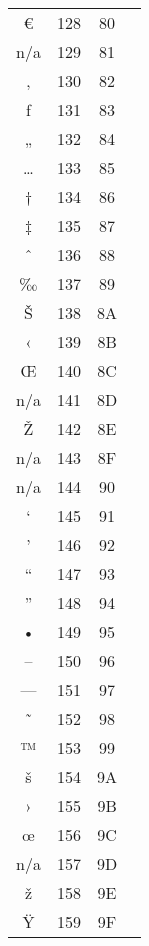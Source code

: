 \documentclass[10pt]{article}
\begin{document}
\begin{tabular}{crcl}
€&128&80&\\
n/a&129&81&\\
‚&130&82&\\
ƒ&131&83&\\
„&132&84&\\
…&133&85&\\
†&134&86&\\
‡&135&87&\\
ˆ&136&88&\\
‰&137&89&\\
Š&138&8A&\\
‹&139&8B&\\
Œ&140&8C&\\
n/a&141&8D&\\
Ž&142&8E&\\
n/a&143&8F&\\
n/a&144&90&\\
‘&145&91&\\
’&146&92&\\
“&147&93&\\
”&148&94&\\
•&149&95&\\
–&150&96&\\
—&151&97&\\
˜&152&98&\\
™&153&99&\\
š&154&9A&\\
›&155&9B&\\
œ&156&9C&\\
n/a&157&9D&\\
ž&158&9E&\\
Ÿ&159&9F&\\
\end{tabular}
\end{document}
